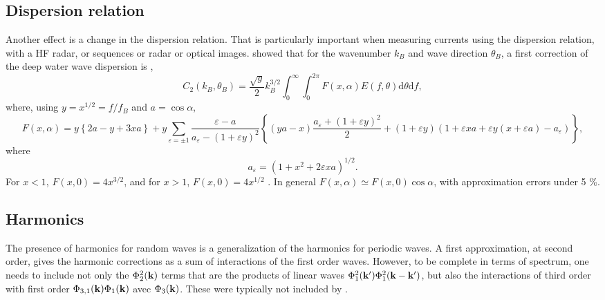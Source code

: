 \subsection{Dispersion relation}
Another effect is a change in the dispersion relation. That is particularly important when measuring currents 
using the dispersion relation, with a HF radar, or sequences or radar or optical images. \cite{Barrick&Weber1977} showed that for the wavenumber 
$k_B$ and wave direction $\theta_B$, a first correction of the deep water wave dispersion is  \citep{Broche&al.1983,Ardhuin&al.2008}, 
\begin{equation}
C_{2}(k_B,\theta_B) =  \frac{\sqrt{g}}{2} k_B^{3/2}
\int_{0}^\infty \int_0^{2 \pi} F(x,\alpha) E(f,\theta) \mathrm{d}
\theta \mathrm{d} f,\nonumber  \label{UsfA2}
\end{equation}
where, using
$y=x^{1/2}=f/f_B$ and $a=\cos \alpha$, 
\begin{equation}
F(x,\alpha)=y\left\{2 a - y+3 x a \right\} + y \sum_{\varepsilon=\pm 1} \frac{\varepsilon -a}{a_\varepsilon
- \left(1 +\varepsilon y\right)^2} \left\{\left(y a -x\right)\frac{a_\varepsilon+\left(1+\varepsilon
y\right)^2}{2} +\left(1+ \varepsilon y\right) \left(1+\varepsilon x a +
\varepsilon y\left(x+\varepsilon
a\right)-a_\varepsilon\right)\right\},
\label{A1corr}
\end{equation}
where
\begin{equation}
a_\varepsilon=\left(1+x^2 + 2 \varepsilon x a \right)^{1/2}.
\end{equation}
For $x<1$,  $F(x,0)=4
x^{3/2}$, and for $x>1$, $F(x,0)=4 x^{1/2}$ \citep{Longuet-Higgins&Phillips1962}. 
In general 
$F(x,\alpha)\simeq F(x,0) \cos \alpha$, with 	approximation errors under 5 \%. 

\subsection{Harmonics}\label{random_harmonics}
The presence of harmonics for random waves is a generalization of the harmonics for periodic waves. 
A first approximation, at second order, gives the harmonic corrections as a sum of interactions of the first order waves. However, to be complete in terms of spectrum, one needs to include not only the $\Phi_{2}^2 (\mathbf{k})$ terms that are the products of linear waves  $\Phi_1^2 (\mathbf{k^{\prime}}) \Phi_1^2 (\mathbf{k} -\mathbf{k^{\prime}})$, but also the interactions of third order with first order $\Phi_{3,1}(\mathbf{k}) \Phi_{1} (\mathbf{k})$ avec $\Phi_{3}(\mathbf{k})$. These were typically not included by \cite{Weber&Barrick1977}. 

